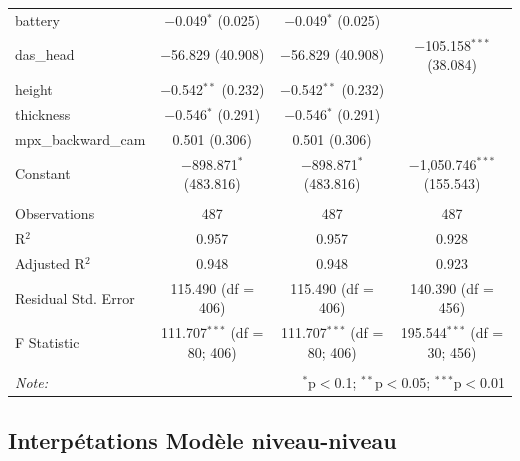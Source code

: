 \documentclass[
  12pt,
]{report}
\begin{document}
\begin{table}[!htbp]
\begin{tabular}{@{\extracolsep{5pt}}lccc}
  battery & $-$0.049$^{*}$ (0.025) & $-$0.049$^{*}$ (0.025) &  \\ 
  das\_head & $-$56.829 (40.908) & $-$56.829 (40.908) & $-$105.158$^{***}$ (38.084) \\ 
  height & $-$0.542$^{**}$ (0.232) & $-$0.542$^{**}$ (0.232) &  \\ 
  thickness & $-$0.546$^{*}$ (0.291) & $-$0.546$^{*}$ (0.291) &  \\ 
  mpx\_backward\_cam & 0.501 (0.306) & 0.501 (0.306) &  \\ 
  Constant & $-$898.871$^{*}$ (483.816) & $-$898.871$^{*}$ (483.816) & $-$1,050.746$^{***}$ (155.543) \\ 
 \hline \\[-1.8ex] 
Observations & 487 & 487 & 487 \\ 
R$^{2}$ & 0.957 & 0.957 & 0.928 \\ 
Adjusted R$^{2}$ & 0.948 & 0.948 & 0.923 \\ 
Residual Std. Error & 115.490 (df = 406) & 115.490 (df = 406) & 140.390 (df = 456) \\ 
F Statistic & 111.707$^{***}$ (df = 80; 406) & 111.707$^{***}$ (df = 80; 406) & 195.544$^{***}$ (df = 30; 456) \\ 
\hline 
\hline \\[-1.8ex] 
\textit{Note:}  & \multicolumn{3}{r}{$^{*}$p$<$0.1; $^{**}$p$<$0.05; $^{***}$p$<$0.01} \\ 
\end{tabular} 
\end{table}

\newpage

\subsection{Interpétations Modèle
niveau-niveau}\label{interpuxe9tations-moduxe8le-niveau-niveau}
\end{document}
